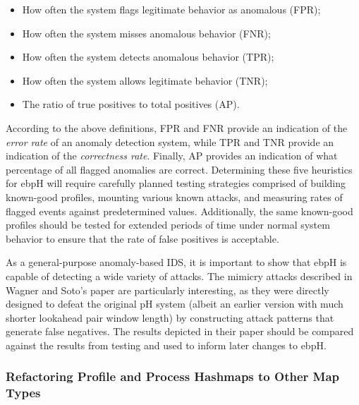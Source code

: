 \documentclass[
  12pt]{findlay}
\providecommand{\tightlist}{\setlength{\itemsep}{0pt}\setlength{\parskip}{0pt}}
\begin{document}
\begin{itemize}
\tightlist
\item
  How often the system flags legitimate behavior as anomalous (FPR);
\item
  How often the system misses anomalous behavior (FNR);
\item
  How often the system detects anomalous behavior (TPR);
\item
  How often the system allows legitimate behavior (TNR);
\item
  The ratio of true positives to total positives (AP).
\end{itemize}

According to the above definitions, FPR and FNR provide an indication of
the \emph{error rate} of an anomaly detection system, while TPR and TNR
provide an indication of the \emph{correctness rate}. Finally, AP
provides an indication of what percentage of all flagged anomalies are
correct. Determining these five heuristics for ebpH will require
carefully planned testing strategies comprised of building known-good
profiles, mounting various known attacks, and measuring rates of flagged
events against predetermined values. Additionally, the same known-good
profiles should be tested for extended periods of time under normal
system behavior to ensure that the rate of false positives is
acceptable.

As a general-purpose anomaly-based IDS, it is important to show that
ebpH is capable of detecting a wide variety of attacks. The mimicry
attacks described in Wagner and Soto's paper \autocite{wagner02} are
particularly interesting, as they were directly designed to defeat the
original pH system (albeit an earlier version with much shorter
lookahead pair window length) by constructing attack patterns that
generate false negatives. The results depicted in their paper should be
compared against the results from testing and used to inform later
changes to ebpH.

\hypertarget{refactoring-profile-and-process-hashmaps-to-other-map-types}{%
\subsubsection{Refactoring Profile and Process Hashmaps to Other Map
Types}\label{refactoring-profile-and-process-hashmaps-to-other-map-types}}

\label{lru_section}
\end{document}
